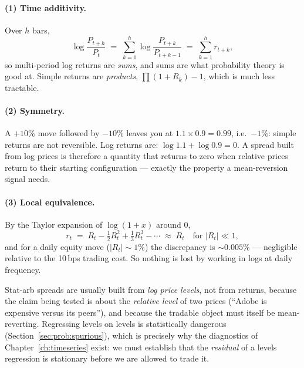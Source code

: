 \paragraph{(1) Time additivity.} Over $h$ bars,
\begin{equation}
  \log\frac{P_{t+h}}{P_t} \;=\; \sum_{k=1}^{h}\log\frac{P_{t+k}}{P_{t+k-1}}
  \;=\; \sum_{k=1}^{h} r_{t+k},
  \label{eq:logadditive}
\end{equation}
so multi-period log returns are \emph{sums}, and sums are what probability theory is
good at. Simple returns are \emph{products}, $\prod(1+R_k)-1$, which is much less
tractable.

\paragraph{(2) Symmetry.} A $+10\%$ move followed by $-10\%$ leaves you at
$1.1\times0.9=0.99$, i.e.\ $-1\%$: simple returns are not reversible. Log returns are:
$\log 1.1 + \log 0.9 = 0$. A spread built from log prices is therefore a quantity that
returns to zero when relative prices return to their starting configuration --- exactly
the property a mean-reversion signal needs.

\paragraph{(3) Local equivalence.} By the Taylor expansion of $\log(1+x)$ around 0,
\begin{equation}
  r_t \;=\; R_t - \tfrac{1}{2}R_t^2 + \tfrac{1}{3}R_t^3 - \cdots
  \;\approx\; R_t \quad \text{for } \lvert R_t\rvert \ll 1,
  \label{eq:logtaylor}
\end{equation}
and for a daily equity move ($\lvert R_t\rvert\sim 1\%$) the discrepancy is
$\sim 0.005\%$ --- negligible relative to the 10\,bps trading cost. So nothing is lost
by working in logs at daily frequency.

\begin{remark}
Stat-arb spreads are usually built from \emph{log price levels}, not from returns,
because the claim being tested is about the \emph{relative level} of two prices
(``Adobe is expensive versus its peers''), and because the tradable object must itself
be mean-reverting. Regressing levels on levels is statistically dangerous
(Section~\ref{sec:prob:spurious}), which is precisely why the diagnostics of
Chapter~\ref{ch:timeseries} exist: we must establish that the \emph{residual} of a
levels regression is stationary before we are allowed to trade it.
\end{remark}

